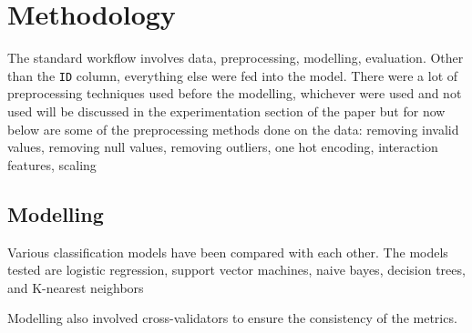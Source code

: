 \section{Methodology}


The standard workflow involves data, preprocessing, modelling, evaluation. Other than the \texttt{ID} column, everything else were fed into the model. There were a lot of preprocessing techniques used before the modelling, whichever were used and not used will be discussed in the experimentation section of the paper but for now below are some of the preprocessing methods done on the data:
removing invalid values, removing null values, removing outliers, one hot encoding, interaction features, scaling


\subsection{Modelling}

Various classification models have been compared with each other. The models tested are logistic regression, support vector machines, naive bayes, decision trees, and K-nearest neighbors

Modelling also involved cross-validators to ensure the consistency of the metrics.
